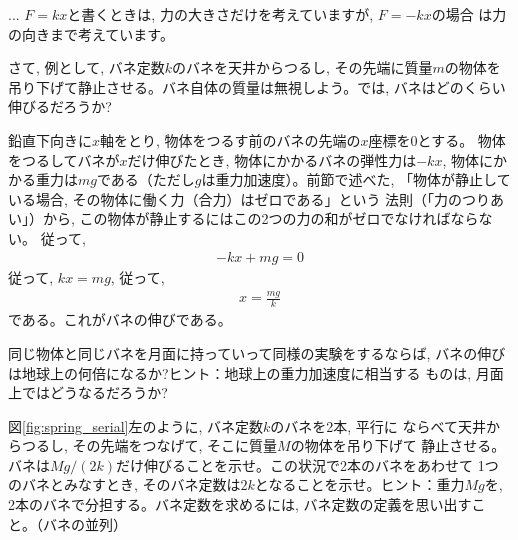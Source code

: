 \begin{faq}{\small{}
... $F=kx$と書くときは, 力の大きさだけを考えていますが, $F=-kx$の場合
は力の向きまで考えています。}\end{faq}\mv

さて, 例として, バネ定数$k$のバネを天井からつるし, その先端に質量$m$の物体を
吊り下げて静止させる。バネ自体の質量は無視しよう。では, バネはどのくらい
伸びるだろうか?

鉛直下向きに$x$軸をとり, 物体をつるす前のバネの先端の$x$座標を0とする。
物体をつるしてバネが$x$だけ伸びたとき, 物体にかかるバネの弾性力は$-kx$, 
物体にかかる重力は$mg$である（ただし$g$は重力加速度）。前節で述べた, 
「物体が静止している場合, その物体に働く力（合力）はゼロである」という
法則（「力のつりあい」）から, この物体が静止するにはこの2つの力の和がゼロでなければならない。
従って, 
\begin{eqnarray}
-kx+mg=0
\end{eqnarray}
従って, $kx=mg$, 従って, 
\begin{eqnarray}
x=\frac{mg}{k}\label{eq:x_mg_k}
\end{eqnarray}
である。これがバネの伸びである。


\begin{q}\label{q:spring_moon}
同じ物体と同じバネを月面に持っていって同様の実験をするならば, 
バネの伸びは地球上の何倍になるか?ヒント：地球上の重力加速度に相当する
ものは, 月面上ではどうなるだろうか?
\end{q}
\mv

\begin{q}\label{q:spring_double_parallel}
図\ref{fig:spring_serial}左のように, バネ定数$k$のバネを2本, 平行に
ならべて天井からつるし, その先端をつなげて, そこに質量$M$の物体を吊り下げて
静止させる。バネは$Mg/(2k)$だけ伸びることを示せ。この状況で2本のバネをあわせて
1つのバネとみなすとき, そのバネ定数は$2k$となることを示せ。ヒント：重力$Mg$を, 
2本のバネで分担する。バネ定数を求めるには, バネ定数の定義を思い出すこと。（バネの並列）
\end{q}
\mv

